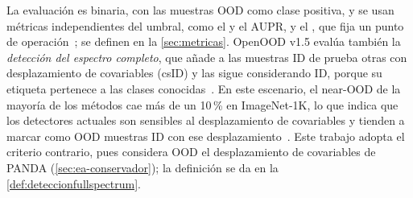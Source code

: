 La evaluación es binaria, con las muestras OOD como clase positiva, y se usan
métricas independientes del umbral, como el \AUROC y el AUPR, y el ,
que fija un punto de operación~\cite{openood15}; se definen en la
\cref{sec:metricas}. OpenOOD v1.5 evalúa también la \emph{detección del espectro
completo}, que añade a las muestras ID de prueba otras con desplazamiento de
covariables (csID) y las sigue considerando ID, porque su etiqueta pertenece a las
clases conocidas~\cite{openood15}. En este escenario, el \AUROC near-OOD de la
mayoría de los métodos cae más de un 10\,\% en ImageNet-1K, lo que indica que
los detectores actuales son sensibles al desplazamiento de covariables y tienden
a marcar como OOD muestras ID con ese
desplazamiento~\cite{openood15,yang2024}. Este trabajo adopta el criterio
contrario, pues considera OOD el desplazamiento de covariables de PANDA
(\cref{sec:ea-conservador}); la definición se da en la
\cref{def:deteccionfullspectrum}.

